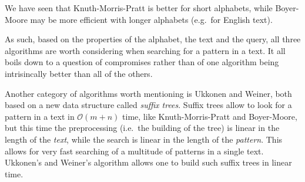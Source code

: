 \documentclass[a4paper,11pt,openany,extrafontsizes,twoside,article]{memoir}
\begin{document}
We have seen that Knuth-Morris-Pratt is better for short alphabets,
while Boyer-Moore may be more efficient with longer alphabets (e.g.\
for English text).

As such, based on the properties of the alphabet, the text and the
query, all three algorithms are worth considering when searching for a
pattern in a text. It all boils down to a question of compromises
rather than of one algorithm being intrisincally better than all of
the others.

Another category of algorithms worth mentioning is Ukkonen and Weiner,
both based on a new data structure called \emph{suffix trees}. Suffix
trees allow to look for a pattern in a text in $\mathcal{O}(m+n)$
time, like Knuth-Morris-Pratt and Boyer-Moore, but this time the
preprocessing (i.e.\ the building of the tree) is linear in the length
of the \emph{text}, while the search is linear in the length of the
\emph{pattern}. This allows for very fast searching of a multitude of
patterns in a single text. Ukkonen's and Weiner's algorithm allows one
to build such suffix trees in linear time.



\nocite{*}


\label{cha:bibliography}
\end{document}
